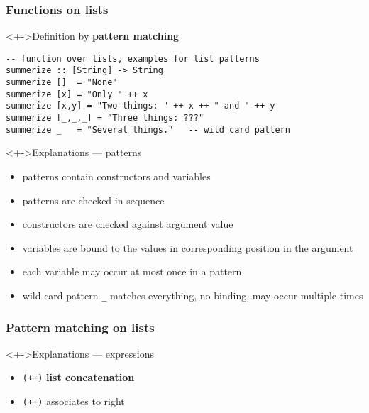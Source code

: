 \documentclass{beamer}
\begin{document}
\begin{frame}[fragile]
  \frametitle{Functions on lists}
  \begin{block}<+->{Definition by \textbf{pattern matching}}
\begin{lstlisting}
-- function over lists, examples for list patterns
summerize :: [String] -> String
summerize []  = "None"
summerize [x] = "Only " ++ x
summerize [x,y] = "Two things: " ++ x ++ " and " ++ y
summerize [_,_,_] = "Three things: ???"
summerize _   = "Several things."   -- wild card pattern
\end{lstlisting}
  \end{block}
  \begin{alertblock}<+->{Explanations --- patterns}
    \footnotesize{}
    \begin{itemize}
    \item patterns contain constructors and variables
    \item patterns are checked in sequence
    \item constructors are checked against argument value
    \item variables are bound to the values in
      corresponding position in the argument
    \item each variable may occur at most once in a pattern
    \item wild card pattern \verb!_! matches everything, no binding, may occur multiple times
    \end{itemize}
  \end{alertblock}

  \end{frame}
\begin{frame}[fragile]
  \frametitle{Pattern matching on lists}
\begin{alertblock}<+->{Explanations --- expressions}
    \begin{itemize}
    \item  \lstinline{(++)} \textbf{list concatenation}
    \item  \lstinline{(++)} associates to right
    \end{itemize}
  \end{alertblock}
  \end{frame}
\end{document}
